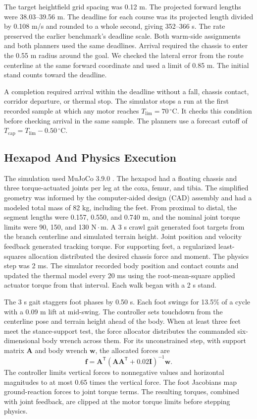 \documentclass{ieeeaccess}
\begin{document}
The target heightfield grid spacing was 0.12 m. The projected forward lengths were 38.03--39.56 m. The deadline for each course was its projected length divided by 0.108 m/s and rounded to a whole second, giving 352--366 s. The rate preserved the earlier benchmark's deadline scale. Both warm-side assignments and both planners used the same deadlines. Arrival required the chassis to enter the 0.55 m radius around the goal. We checked the lateral error from the route centerline at the same forward coordinate and used a limit of 0.85 m. The initial stand counts toward the deadline.

A completion required arrival within the deadline without a fall, chassis contact, corridor departure, or thermal stop. The simulator stops a run at the first recorded sample at which any motor reaches $T_{\mathrm{lim}}=70\,{}^\circ\mathrm{C}$. It checks this condition before checking arrival in the same sample. The planners use a forecast cutoff of $T_{\mathrm{cap}}=T_{\mathrm{lim}}-0.50\,{}^\circ\mathrm{C}$.

\subsection{Hexapod And Physics Execution}

The simulation used MuJoCo 3.9.0 \cite{todorov2012}. The hexapod had a floating chassis and three torque-actuated joints per leg at the coxa, femur, and tibia. The simplified geometry was informed by the computer-aided design (CAD) assembly and had a modeled total mass of 82 kg, including the feet. From proximal to distal, the segment lengths were 0.157, 0.550, and 0.740 m, and the nominal joint torque limits were 90, 150, and 130 $\mathrm{N}{\cdot}\mathrm{m}$. A 3 s crawl gait generated foot targets from the branch centerline and simulated terrain height. Joint position and velocity feedback generated tracking torque. For supporting feet, a regularized least-squares allocation distributed the desired chassis force and moment. The physics step was 2 ms. The simulator recorded body position and contact counts and updated the thermal model every 20 ms using the root-mean-square applied actuator torque from that interval. Each walk began with a 2 s stand.

The 3 s gait staggers foot phases by 0.50 s. Each foot swings for 13.5\% of a cycle with a 0.09 m lift at mid-swing. The controller sets touchdown from the centerline pose and terrain height ahead of the body. When at least three feet meet the stance-support test, the force allocator distributes the commanded six-dimensional body wrench across them. For its unconstrained step, with support matrix $\mathbf{A}$ and body wrench $\mathbf{w}$, the allocated forces are
\begin{equation}
\mathbf{f}=\mathbf{A}^{\mathsf T}
   \left(\mathbf{A}\mathbf{A}^{\mathsf T}
    +0.02\mathbf{I}\right)^{-1}\mathbf{w}.
\end{equation}
The controller limits vertical forces to nonnegative values and horizontal magnitudes to at most 0.65 times the vertical force. The foot Jacobians map ground-reaction forces to joint torque terms. The resulting torques, combined with joint feedback, are clipped at the motor torque limits before stepping physics.
\end{document}
